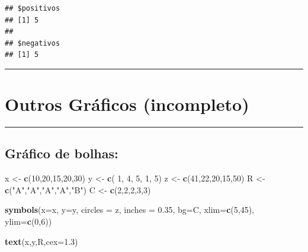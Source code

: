 \documentclass[
]{book}
\newenvironment{Shaded}{\begin{snugshade}}{\end{snugshade}}
\newcommand{\AttributeTok}[1]{\textcolor[rgb]{0.13,0.29,0.53}{#1}}
\newcommand{\DecValTok}[1]{\textcolor[rgb]{0.00,0.00,0.81}{#1}}
\newcommand{\FloatTok}[1]{\textcolor[rgb]{0.00,0.00,0.81}{#1}}
\newcommand{\FunctionTok}[1]{\textcolor[rgb]{0.13,0.29,0.53}{\textbf{#1}}}
\newcommand{\NormalTok}[1]{#1}
\newcommand{\OtherTok}[1]{\textcolor[rgb]{0.56,0.35,0.01}{#1}}
\newcommand{\StringTok}[1]{\textcolor[rgb]{0.31,0.60,0.02}{#1}}
\begin{document}
\begin{verbatim}
## $positivos
## [1] 5
## 
## $negativos
## [1] 5
\end{verbatim}

\begin{center}\rule{0.5\linewidth}{0.5pt}\end{center}

\chapter{Outros Gráficos (incompleto)}\label{outros-gruxe1ficos-incompleto}

\begin{center}\rule{0.5\linewidth}{0.5pt}\end{center}

\section{Gráfico de bolhas:}\label{gruxe1fico-de-bolhas}

\begin{Shaded}
\begin{Highlighting}[]
\NormalTok{x }\OtherTok{\textless{}{-}} \FunctionTok{c}\NormalTok{(}\DecValTok{10}\NormalTok{,}\DecValTok{20}\NormalTok{,}\DecValTok{15}\NormalTok{,}\DecValTok{20}\NormalTok{,}\DecValTok{30}\NormalTok{)}
\NormalTok{y }\OtherTok{\textless{}{-}} \FunctionTok{c}\NormalTok{( }\DecValTok{1}\NormalTok{, }\DecValTok{4}\NormalTok{, }\DecValTok{5}\NormalTok{, }\DecValTok{1}\NormalTok{, }\DecValTok{5}\NormalTok{)}
\NormalTok{z }\OtherTok{\textless{}{-}} \FunctionTok{c}\NormalTok{(}\DecValTok{41}\NormalTok{,}\DecValTok{22}\NormalTok{,}\DecValTok{20}\NormalTok{,}\DecValTok{15}\NormalTok{,}\DecValTok{50}\NormalTok{)}
\NormalTok{R }\OtherTok{\textless{}{-}} \FunctionTok{c}\NormalTok{(}\StringTok{"A"}\NormalTok{,}\StringTok{"A"}\NormalTok{,}\StringTok{"A"}\NormalTok{,}\StringTok{"A"}\NormalTok{,}\StringTok{"B"}\NormalTok{)}
\NormalTok{C }\OtherTok{\textless{}{-}} \FunctionTok{c}\NormalTok{(}\DecValTok{2}\NormalTok{,}\DecValTok{2}\NormalTok{,}\DecValTok{2}\NormalTok{,}\DecValTok{3}\NormalTok{,}\DecValTok{3}\NormalTok{)}

\FunctionTok{symbols}\NormalTok{(}\AttributeTok{x=}\NormalTok{x,  }\AttributeTok{y=}\NormalTok{y,}
        \AttributeTok{circles =}\NormalTok{ z, }
        \AttributeTok{inches =} \FloatTok{0.35}\NormalTok{,}
        \AttributeTok{bg=}\NormalTok{C,}
        \AttributeTok{xlim=}\FunctionTok{c}\NormalTok{(}\DecValTok{5}\NormalTok{,}\DecValTok{45}\NormalTok{),}
        \AttributeTok{ylim=}\FunctionTok{c}\NormalTok{(}\DecValTok{0}\NormalTok{,}\DecValTok{6}\NormalTok{))}

\FunctionTok{text}\NormalTok{(x,y,R,}\AttributeTok{cex=}\FloatTok{1.3}\NormalTok{)}
\end{Highlighting}
\end{Shaded}
\end{document}
